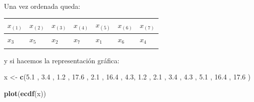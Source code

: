 \documentclass[
]{article}
\newenvironment{Shaded}{\begin{snugshade}}{\end{snugshade}}
\newcommand{\FloatTok}[1]{\textcolor[rgb]{0.00,0.00,0.81}{#1}}
\newcommand{\FunctionTok}[1]{\textcolor[rgb]{0.13,0.29,0.53}{\textbf{#1}}}
\newcommand{\NormalTok}[1]{#1}
\newcommand{\OtherTok}[1]{\textcolor[rgb]{0.56,0.35,0.01}{#1}}
\begin{document}
Una vez ordenada queda:

\begin{longtable}[]{@{}
  >{\centering\arraybackslash}p{}
  >{\centering\arraybackslash}p{}
  >{\centering\arraybackslash}p{}
  >{\centering\arraybackslash}p{}
  >{\centering\arraybackslash}p{}
  >{\centering\arraybackslash}p{}
  >{\centering\arraybackslash}p{}@{}}
\toprule\noalign{}
\begin{minipage}[b]{\linewidth}\centering
\(x_{(1)}\)
\end{minipage} & \begin{minipage}[b]{\linewidth}\centering
\(x_{(2)}\)
\end{minipage} & \begin{minipage}[b]{\linewidth}\centering
\(x_{(3)}\)
\end{minipage} & \begin{minipage}[b]{\linewidth}\centering
\(x_{(4)}\)
\end{minipage} & \begin{minipage}[b]{\linewidth}\centering
\(x_{(5)}\)
\end{minipage} & \begin{minipage}[b]{\linewidth}\centering
\(x_{(6)}\)
\end{minipage} & \begin{minipage}[b]{\linewidth}\centering
\(x_{(7)}\)
\end{minipage} \\
\midrule\noalign{}
\endhead
\bottomrule\noalign{}
\endlastfoot
\(x_{3}\) & \(x_{5}\) & \(x_{2}\) & \(x_{7}\) & \(x_{1}\) & \(x_{6}\) & \(x_{4}\) \\
1.2 & 2.1 & 3.4 & 4.3 & 5.1 & 16.4 & 17.6 \\
\end{longtable}

y si hacemos la representación gráfica:

\begin{Shaded}
\begin{Highlighting}[]
\NormalTok{x }\OtherTok{\textless{}{-}} \FunctionTok{c}\NormalTok{(}\FloatTok{5.1}\NormalTok{ , }\FloatTok{3.4}\NormalTok{ , }\FloatTok{1.2}\NormalTok{ , }\FloatTok{17.6}\NormalTok{ , }\FloatTok{2.1}\NormalTok{ , }\FloatTok{16.4}\NormalTok{ , }\FloatTok{4.3}\NormalTok{, }\FloatTok{1.2}\NormalTok{ , }\FloatTok{2.1}\NormalTok{ , }\FloatTok{3.4}\NormalTok{ , }\FloatTok{4.3}\NormalTok{ , }\FloatTok{5.1}\NormalTok{ , }\FloatTok{16.4}\NormalTok{ , }\FloatTok{17.6}\NormalTok{ )}

\FunctionTok{plot}\NormalTok{(}\FunctionTok{ecdf}\NormalTok{(x))}
\end{Highlighting}
\end{Shaded}
\end{document}
